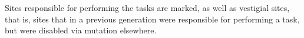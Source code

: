 Sites responsible for performing the tasks are marked, as well as vestigial sites, that is, sites that in a previous generation were responsible for performing a task, but were disabled via mutation elsewhere.